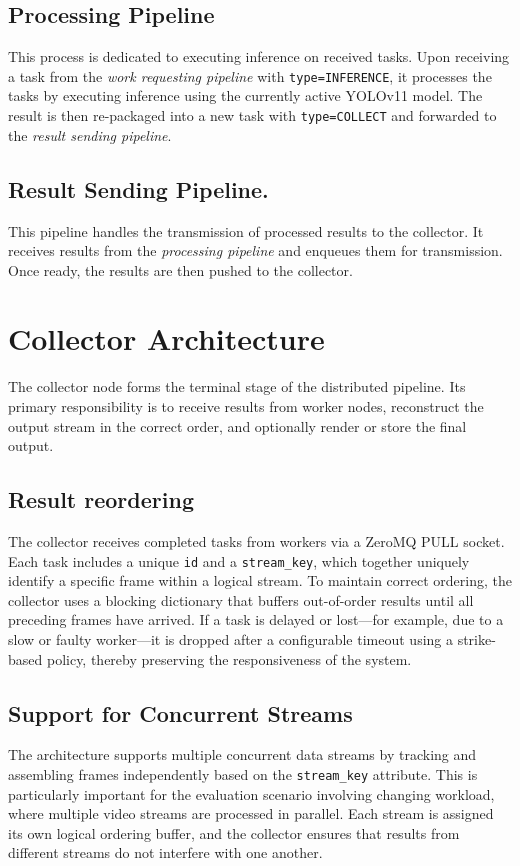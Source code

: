 \subsection{Processing Pipeline}
This process is dedicated to executing inference on received tasks. Upon receiving a task from the \textit{work requesting pipeline} with \texttt{type=INFERENCE}, it processes the tasks by executing inference using the currently active YOLOv11 model. The result is then re-packaged into a new task with \texttt{type=COLLECT} and forwarded to the \textit{result sending pipeline}.

\subsection{Result Sending Pipeline.}
This pipeline handles the transmission of processed results to the collector. It receives results from the \textit{processing pipeline} and enqueues them for transmission. Once ready, the results are then pushed to the collector.

\section{Collector Architecture}
The collector node forms the terminal stage of the distributed pipeline. Its primary responsibility is to receive results from worker nodes, reconstruct the output stream in the correct order, and optionally render or store the final output. 


\subsection{Result reordering}
The collector receives completed tasks from workers via a ZeroMQ PULL socket. Each task includes a unique \texttt{id} and a \texttt{stream\_key}, which together uniquely identify a specific frame within a logical stream. To maintain correct ordering, the collector uses a blocking dictionary that buffers out-of-order results until all preceding frames have arrived. If a task is delayed or lost—for example, due to a slow or faulty worker—it is dropped after a configurable timeout using a strike-based policy, thereby preserving the responsiveness of the system.

\subsection{Support for Concurrent Streams}
The architecture supports multiple concurrent data streams by tracking and assembling frames independently based on the \texttt{stream\_key} attribute. This is particularly important for the evaluation scenario involving changing workload, where multiple video streams are processed in parallel. Each stream is assigned its own logical ordering buffer, and the collector ensures that results from different streams do not interfere with one another.

